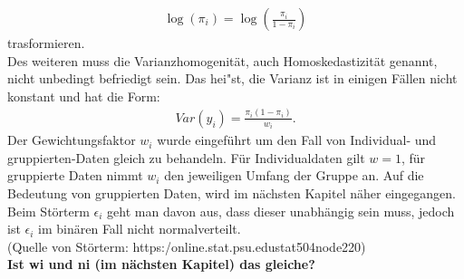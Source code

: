 \documentclass[12pt]{scrreprt}
\begin{document}
	\begin{align}
	\log(\pi_{i})=\log(\frac{\pi_{i}}{1-\pi_{i}})
	\end{align}
	trasformieren. \\
	Des weiteren muss die Varianzhomogenität, auch Homoskedastizität genannt, nicht unbedingt befriedigt sein. Das hei"st, die Varianz ist in einigen Fällen nicht konstant und hat die Form:
	\begin{align}
	Var(y_{i})=\frac{\pi_{i}(1-\pi_{i})}{w_{i}}.
	\end{align}
	Der Gewichtungsfaktor $w_{i}$ wurde eingeführt um den Fall von Individual- und gruppierten-Daten gleich zu behandeln. Für Individualdaten gilt $w=1$, für gruppierte Daten nimmt $w_{i}$ den jeweiligen Umfang der Gruppe an. Auf die Bedeutung von gruppierten Daten, wird im nächsten Kapitel näher eingegangen. 
	Beim Störterm $\epsilon_{i}$ geht man davon aus, dass dieser unabhängig sein muss, jedoch ist $\epsilon_{i}$ im binären Fall nicht normalverteilt. \\
	(Quelle von Störterm: https:\//online.stat.psu.edu\/stat504\/node\/220\/) \\
	\textbf{Ist wi und ni (im nächsten Kapitel) das gleiche?}
\end{document}
